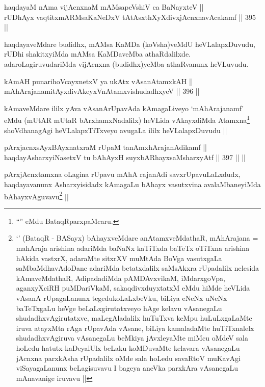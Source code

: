 \begin{shl}
haqdayaM nAma vijAcnxnaM mAMsapeVshiV ca BaNayxteV || \\
rUDhAyx vaqtitxmARMsaKaNeDxV tAtAsxthXyXdivxjAcnxnavAcakamf ||  395 ||  
\end{shl}

\begin{artha}
haqdayaveMdare budidhx, mAMsa KaMDa (koVsha)veMdU heVLalapxDuvudu,
rUDhi shakitxyiMda mAMsa KaMDaveMba
athaRdalilxde. adaroLagiruvudariMda vijAcnxna (budidhx)yeMba
athaRvanunx heVLuvudu.
\end{artha}


\begin{shl}
kAmAH punarihoVcayxnetxV ya ukAtx vAsanAtamxkAH || \\
mAhArajanamitAyxdivAkeyxVnA\s \s tamxvishudadhxyeV ||  396 ||  
\end{shl}

\begin{artha}
kAmaveMdare ililx yAva vAsanArUpavAda kAmagaLiveyo `mAhArajanamf' eMdu
(mUtAR mUtaR bArxhamxNadalilx) heVLida vAkayxdiMda
Atamxna\footnote{``\stext'' eMdu BataqRparxpaMcaru.}
shoVdhanagAgi heVLalapxTiTxveyo avugaLa ililx heVLalapxDuvudu ||
\end{artha}


\begin{shl}
pArxjacnxsAyxBAyxnatxraM rUpaM tanAmxhArajanAdikamf || \\
haqdayAsharxyiNasetxV tu bAhAyxH suyxbARhayxsaMsharxyAtf ||  397 ||  ||  
\end{shl}

\begin{artha}
pArxjAcnxtamxna oLagina rUpavu mAhA rajanAdi savxrUpavuLaLxdudx,
haqdayavanunx Asharxyisidadx kAmagaLu bAhayx vasutxvina
avalaMbaneyiMda bAhayxvAguvavu\footnote{`\stext' (BataqR - BASayx)
  bAhayxveMdare anAtamxveMdathaR, mAhArajana = mahAraja arishina
  adariMda baNaNx kaTiTxda baTeTx oTiTxna arishina hAkida vastxrX,
  adaraMte sitxrXV muMtAda BoVga vasutxgaLa saMbaMdhavAdoDane adariMda
  betatxdalilx saMsAkxra rUpadalilx nelesida kAmaveMdathaR,
  AdipadadiMda pAMDAvxvikaM, iMdarxgoVpa, aganxyXciRH puMDariVkaM,
  sakaqdivxduyxtatxM eMdu hiMde heVLida vAsanA rUpagaLanunx
  tegedukoLaLxbeVku, biLiya eNeNx uNeNx baTeTxgaLu heVge
  beLaLxgirutatxveyo hAge kelavu vAsanegaLu shudadhxvAgirutatxve,
  maLegAladalilx huTuTxva keMpu huLuLxgaLaMte iruva atayxMta rAga
  rUpavAda vAsane, biLiya kamaladaMte huTiTxnalelx shudadhxvAgiruva
  vAsanegaLu beMkiya jAvxleyaMte miMcu oMdeV sala hoLedu
  hatutx-kaDeyalUlx beLaku koMDuvaMte kelavara vAsanegaLu jAcnxna
  parxkAsha rUpadalilx oMde sala hoLedu savaRtoV muKavAgi
  viSayagaLanunx beLagisuvavu I bageya aneVka parxkAra vAsanegaLu
  mAnavanige iruvavu ||} ||
\end{artha}

